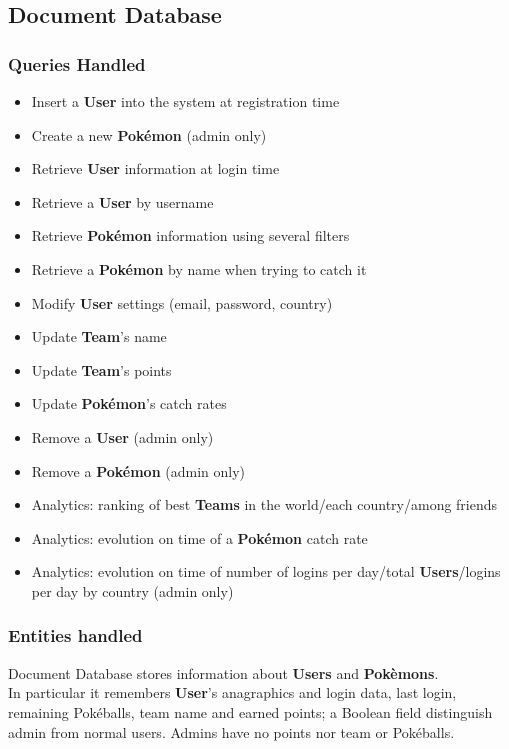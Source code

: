 \subsection{Document Database}
\subsubsection{Queries Handled}
\begin{itemize}
	\item Insert a \textbf{User} into the system at registration time
	\item Create a new \textbf{Pokémon} (admin only)
	\item Retrieve \textbf{User} information at login time
	\item Retrieve a \textbf{User} by username
	\item Retrieve \textbf{Pokémon} information using several filters
	\item Retrieve a \textbf{Pokémon} by name when trying to catch it
	\item Modify \textbf{User} settings (email, password, country)
	\item Update \textbf{Team}’s name
	\item Update \textbf{Team}’s points
	\item Update \textbf{Pokémon}’s catch rates 
	\item Remove a \textbf{User} (admin only)
	\item Remove a \textbf{Pokémon} (admin only)
	\item Analytics: ranking of best \textbf{Teams} in the world/each country/among friends
	\item Analytics: evolution on time of a \textbf{Pokémon} catch rate
	\item Analytics: evolution on time of number of logins per day/total \textbf{Users}/logins per day by country (admin only)
\end{itemize}
\subsubsection{Entities handled}
Document Database stores information about \textbf{Users} and \textbf{Pokèmons}. \medspace \\ 

In particular it remembers \textbf{User}’s anagraphics and login data, last login, remaining Pokéballs, team name and earned points; a Boolean field distinguish admin from normal users. Admins have no points nor team or Pokéballs.\\

